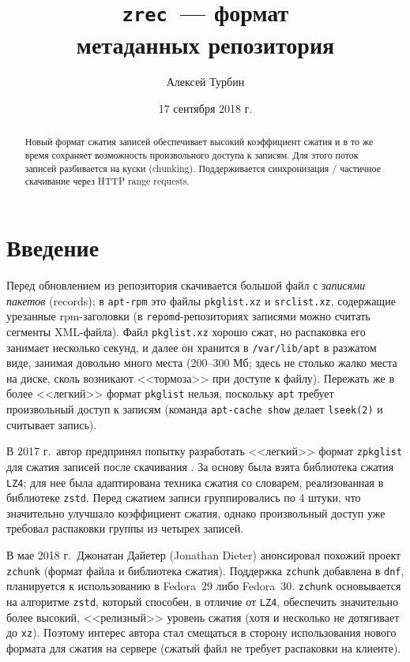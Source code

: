 \documentclass[russian,a4paper,12pt]{article}
\begin{document}
\title{\texttt{zrec}~--- формат\\метаданных репозитория}
\author{Алексей Турбин}
\date{17 сентября 2018 г.}
\maketitle

\begin{abstract}
Новый формат сжатия записей обеспечивает высокий коэффициент сжатия и в то же время
сохраняет возможность произвольного доступа к записям.
Для этого поток записей разбивается на куски (chunking).
Поддерживается синхронизация / частичное скачивание через HTTP range requests.
\end{abstract}

\section{Введение}
Перед обновлением из репозитория скачивается большой файл с \textit{записями пакетов} (records);
в \verb|apt-rpm| это файлы \verb|pkglist.xz| и \verb|srclist.xz|, содержащие урезанные
rpm-заголовки (в \verb|repomd|-репозиториях записями можно считать сегменты XML-файла).
Файл \verb|pkglist.xz| хорошо сжат, но распаковка его занимает несколько секунд, и далее
он хранится в \verb|/var/lib/apt| в разжатом виде, занимая довольно много места (200--300 Мб;
здесь не столько жалко места на диске, сколь возникают <<тормоза>> при доступе к файлу).
Пережать же в более <<легкий>> формат \verb|pkglist| нельзя, поскольку \verb|apt| требует произвольный
доступ к записям (команда \texttt{apt-cache show} делает \verb|lseek(2)| и считывает запись).

В 2017 г.~автор предпринял попытку разработать <<легкий>> формат \verb|zpkglist|
для сжатия записей после скачивания \cite{zpkglist}.
За основу была взята библиотека сжатия \verb|LZ4|; для нее была адаптирована техника сжатия со словарем,
реализованная в библиотеке \verb|zstd|.  Перед сжатием записи группировались по 4 штуки, что значительно
улучшало коэффициент сжатия, однако произвольный доступ уже требовал распаковки группы из четырех записей.

В мае 2018 г.~Джонатан Дайетер (Jonathan Dieter) анонсировал похожий проект \verb|zchunk| \cite{dieter}
(формат файла и библиотека сжатия).  Поддержка \verb|zchunk| добавлена в \verb|dnf|, планируется к использованию
в Fedora~29 либо Fedora~30.  \verb|zchunk| основывается на алгоритме \verb|zstd|, который способен, в отличие от \verb|LZ4|,
обеспечить значительно более высокий, <<релизный>> уровень сжатия (хотя и несколько не дотягивает до \verb|xz|).
Поэтому интерес автора стал смещаться в сторону использования нового формата для сжатия на сервере (сжатый файл
не требует распаковки на клиенте).
\end{document}
